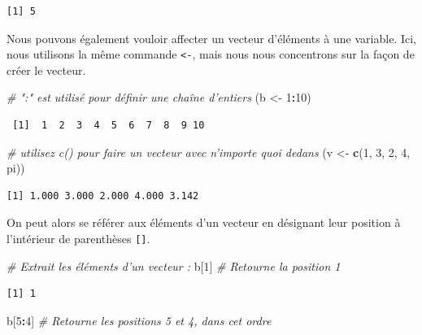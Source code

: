 \documentclass[12pt,]{book}
\newenvironment{Shaded}{\begin{snugshade}}{\end{snugshade}}
\newcommand{\CommentTok}[1]{\textcolor[rgb]{0.56,0.35,0.01}{\textit{#1}}}
\newcommand{\DecValTok}[1]{\textcolor[rgb]{0.00,0.00,0.81}{#1}}
\newcommand{\KeywordTok}[1]{\textcolor[rgb]{0.13,0.29,0.53}{\textbf{#1}}}
\newcommand{\NormalTok}[1]{#1}
\newcommand{\OperatorTok}[1]{\textcolor[rgb]{0.81,0.36,0.00}{\textbf{#1}}}
\newcommand{\StringTok}[1]{\textcolor[rgb]{0.31,0.60,0.02}{#1}}
\begin{document}
\begin{verbatim}
[1] 5
\end{verbatim}

Nous pouvons également vouloir affecter un vecteur d'éléments à une variable. Ici, nous utilisons la même commande \texttt{\textless{}-}, mais nous nous concentrons sur la façon de créer le vecteur.

\begin{Shaded}
\begin{Highlighting}[]
\CommentTok{# ":"  est utilisé pour définir une chaîne d'entiers}
\NormalTok{(b <-}\StringTok{ }\DecValTok{1}\OperatorTok{:}\DecValTok{10}\NormalTok{)}
\end{Highlighting}
\end{Shaded}

\begin{verbatim}
 [1]  1  2  3  4  5  6  7  8  9 10
\end{verbatim}

\begin{Shaded}
\begin{Highlighting}[]
\CommentTok{# utilisez c() pour faire un vecteur avec n'importe quoi dedans}
\NormalTok{(v <-}\StringTok{ }\KeywordTok{c}\NormalTok{(}\DecValTok{1}\NormalTok{, }\DecValTok{3}\NormalTok{, }\DecValTok{2}\NormalTok{, }\DecValTok{4}\NormalTok{, pi))}
\end{Highlighting}
\end{Shaded}

\begin{verbatim}
[1] 1.000 3.000 2.000 4.000 3.142
\end{verbatim}

On peut alors se référer aux éléments d'un vecteur en désignant leur position à l'intérieur de parenthèses \texttt{{[}{]}}.

\begin{Shaded}
\begin{Highlighting}[]
\CommentTok{# Extrait les éléments d'un vecteur :}
\NormalTok{b[}\DecValTok{1}\NormalTok{]                   }\CommentTok{# Retourne la position 1}
\end{Highlighting}
\end{Shaded}

\begin{verbatim}
[1] 1
\end{verbatim}

\begin{Shaded}
\begin{Highlighting}[]
\NormalTok{b[}\DecValTok{5}\OperatorTok{:}\DecValTok{4}\NormalTok{]                 }\CommentTok{# Retourne les positions 5 et 4, dans cet ordre}
\end{Highlighting}
\end{Shaded}
\end{document}
